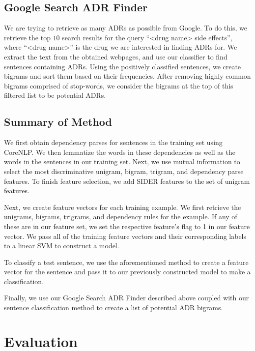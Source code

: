 \documentclass{acm_proc_article-sp}
\begin{document}
\noindent{}

\subsection{Google Search ADR Finder}
We are trying to retrieve as many ADRs as possible from Google. To do this, we retrieve the top $10$ search results for the query ``<drug name> side effects'', where ``<drug name>'' is the drug we are interested in finding ADRs for. We extract the text from the obtained webpages, and use our classifier to find sentences containing ADRs. Using the positively classified sentences, we create bigrams and sort them based on their frequencies. After removing highly common bigrams comprised of stop-words, we consider the bigrams at the top of this filtered list to be potential ADRs.

\subsection{Summary of Method}
We first obtain dependency parses for sentences in the training set using CoreNLP. We then lemmatize the words in these dependencies as well as the words in the sentences in our training set. Next, we use mutual information to select the most discriminative unigram, bigram, trigram, and dependency parse features. To finish feature selection, we add SIDER features to the set of unigram features. 

Next, we create feature vectors for each training example. We first retrieve the unigrams, bigrams, trigrams, and dependency rules for the example. If any of these are in our feature set, we set the respective feature's flag to 1 in our feature vector. We pass all of the training feature vectors and their corresponding labels to a linear SVM to construct a model.

To classify a test sentence, we use the aforementioned method to create a feature vector for the sentence and pass it to our previously constructed model to make a classification. 

Finally, we use our Google Search ADR Finder described above coupled with our sentence classification method to create a list of potential ADR bigrams.

\section{Evaluation}
\end{document}
